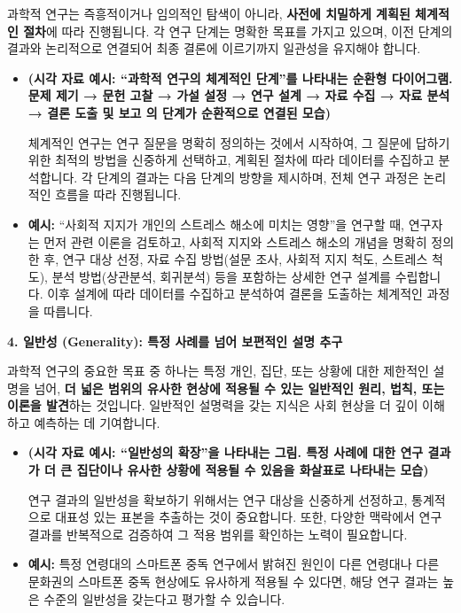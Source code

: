\documentclass[
  letterpaper,
]{book}
\begin{document}
과학적 연구는 즉흥적이거나 임의적인 탐색이 아니라, \textbf{사전에
치밀하게 계획된 체계적인 절차}에 따라 진행됩니다. 각 연구 단계는 명확한
목표를 가지고 있으며, 이전 단계의 결과와 논리적으로 연결되어 최종 결론에
이르기까지 일관성을 유지해야 합니다.

\begin{itemize}
\item
  \textbf{(시각 자료 예시: ``과학적 연구의 체계적인 단계''를 나타내는
  순환형 다이어그램. 문제 제기 → 문헌 고찰 → 가설 설정 → 연구 설계 →
  자료 수집 → 자료 분석 → 결론 도출 및 보고 의 단계가 순환적으로 연결된
  모습)}

  체계적인 연구는 연구 질문을 명확히 정의하는 것에서 시작하여, 그 질문에
  답하기 위한 최적의 방법을 신중하게 선택하고, 계획된 절차에 따라
  데이터를 수집하고 분석합니다. 각 단계의 결과는 다음 단계의 방향을
  제시하며, 전체 연구 과정은 논리적인 흐름을 따라 진행됩니다.
\item
  \textbf{예시:} ``사회적 지지가 개인의 스트레스 해소에 미치는 영향''을
  연구할 때, 연구자는 먼저 관련 이론을 검토하고, 사회적 지지와 스트레스
  해소의 개념을 명확히 정의한 후, 연구 대상 선정, 자료 수집 방법(설문
  조사, 사회적 지지 척도, 스트레스 척도), 분석 방법(상관분석, 회귀분석)
  등을 포함하는 상세한 연구 설계를 수립합니다. 이후 설계에 따라 데이터를
  수집하고 분석하여 결론을 도출하는 체계적인 과정을 따릅니다.
\end{itemize}

\textbf{4. 일반성 (Generality): 특정 사례를 넘어 보편적인 설명 추구}

과학적 연구의 중요한 목표 중 하나는 특정 개인, 집단, 또는 상황에 대한
제한적인 설명을 넘어, \textbf{더 넓은 범위의 유사한 현상에 적용될 수
있는 일반적인 원리, 법칙, 또는 이론을 발견}하는 것입니다. 일반적인
설명력을 갖는 지식은 사회 현상을 더 깊이 이해하고 예측하는 데
기여합니다.

\begin{itemize}
\item
  \textbf{(시각 자료 예시: ``일반성의 확장''을 나타내는 그림. 특정
  사례에 대한 연구 결과가 더 큰 집단이나 유사한 상황에 적용될 수 있음을
  화살표로 나타내는 모습)}

  연구 결과의 일반성을 확보하기 위해서는 연구 대상을 신중하게 선정하고,
  통계적으로 대표성 있는 표본을 추출하는 것이 중요합니다. 또한, 다양한
  맥락에서 연구 결과를 반복적으로 검증하여 그 적용 범위를 확인하는
  노력이 필요합니다.
\item
  \textbf{예시:} 특정 연령대의 스마트폰 중독 연구에서 밝혀진 원인이 다른
  연령대나 다른 문화권의 스마트폰 중독 현상에도 유사하게 적용될 수
  있다면, 해당 연구 결과는 높은 수준의 일반성을 갖는다고 평가할 수
  있습니다.
\end{itemize}
\end{document}
